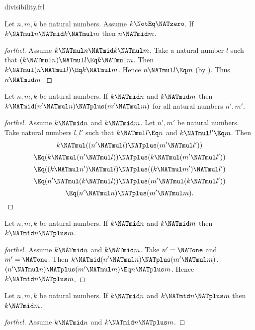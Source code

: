 \documentclass{stex}
\begin{document}
\begin{smodule}{divisibility.ftl}
\begin{proposition}[forthel]
  Let $n, m, k$ be natural numbers.
  Assume $k \NotEq \NATzero$.
  If $k \NATmul n \NATmid k \NATmul m$ then $n \NATmid m$.
\end{proposition}
\begin{proof}[forthel]
  Assume $k \NATmul n \NATmid k \NATmul m$.
  Take a natural number $l$ such that $(k \NATmul n) \NATmul l \Eq k \NATmul m$.
  Then $k \NATmul (n \NATmul l) \Eq k \NATmul m$.
  Hence $n \NATmul l \Eq m$ (by ).
  Thus $n \NATmid m$.
\end{proof}

\begin{proposition}[forthel]
  Let $n, m, k$ be natural numbers.
  If $k \NATmid n$ and $k \NATmid m$ then $k \NATmid (n' \NATmul n) \NATplus (m' \NATmul m)$
  for all natural numbers $n', m'$.
\end{proposition}
\begin{proof}[forthel]
  Assume $k \NATmid n$ and $k \NATmid m$.
  Let $n', m'$ be natural numbers.
  Take natural numbers $l,l'$ such that $k \NATmul l \Eq n$ and $k \NATmul l' \Eq m$.
  Then
  \[  k \NATmul ((n' \NATmul l) \NATplus (m' \NATmul l'))                \]
  \[    \Eq (k \NATmul (n' \NATmul l)) \NATplus (k \NATmul (m' \NATmul l'))  \]
  \[    \Eq ((k \NATmul n') \NATmul l) \NATplus ((k \NATmul m') \NATmul l')  \]
  \[    \Eq (n' \NATmul (k \NATmul l)) \NATplus (m' \NATmul (k \NATmul l'))  \]
  \[    \Eq (n' \NATmul n) \NATplus (m' \NATmul m).                      \]
\end{proof}

\begin{corollary}[forthel]
  Let $n, m, k$ be natural numbers.
  If $k \NATmid n$ and $k \NATmid m$ then $k \NATmid n \NATplus m$.
\end{corollary}
\begin{proof}[forthel]
  Assume $k \NATmid n$ and $k \NATmid m$.
  Take $n' = \NATone$ and $m' = \NATone$.
  Then $k \NATmid (n' \NATmul n) \NATplus (m' \NATmul m)$.
  $(n' \NATmul n) \NATplus (m' \NATmul m) \Eq n \NATplus m$.
  Hence $k \NATmid n \NATplus m$.
\end{proof}


\begin{proposition}[forthel,name=divisibility of summands]
  Let $n, m, k$ be natural numbers.
  If $k \NATmid n$ and $k \NATmid n \NATplus m$ then $k \NATmid m$.
\end{proposition}
\begin{proof}[forthel]
  Assume $k \NATmid n$ and $k \NATmid n \NATplus m$.


\end{proof}
\end{smodule}
\end{document}
